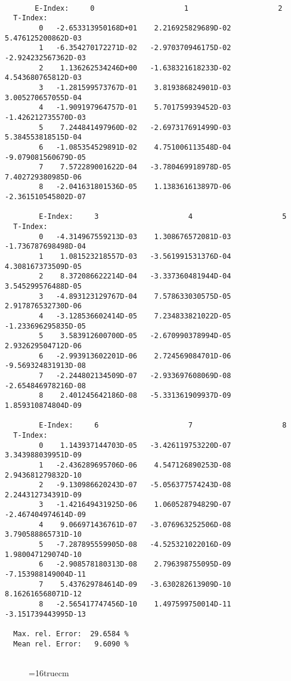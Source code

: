 \documentclass[12pt,dvipdfmx]{article}
\begin{document}
\begin{small}\begin{verbatim}

       E-Index:     0                     1                     2
  T-Index:
        0   -2.653313950168D+01    2.216925829689D-02    5.476125200862D-03
        1   -6.354270172271D-02   -2.970370946175D-02   -2.924232567362D-03
        2    1.136262534246D+00   -1.638321618233D-02    4.543680765812D-03
        3   -1.281599573767D-01    3.819386824901D-03    3.005270657055D-04
        4   -1.909197964757D-01    5.701759939452D-03   -1.426212735570D-03
        5    7.244841497960D-02   -2.697317691499D-03    5.384553818515D-04
        6   -1.085354529891D-02    4.751006113548D-04   -9.079081560679D-05
        7    7.572289001622D-04   -3.780469918978D-05    7.402729380985D-06
        8   -2.041631801536D-05    1.138361613897D-06   -2.361510545802D-07

        E-Index:     3                     4                     5
  T-Index:
        0   -4.314967559213D-03    1.308676572081D-03   -1.736787698498D-04
        1    1.081523218557D-03   -3.561991531376D-04    4.308167373509D-05
        2    8.372086622214D-04   -3.337360481944D-04    3.545299576488D-05
        3   -4.893123129767D-04    7.578633030575D-05    2.917876532730D-06
        4   -3.128536602414D-05    7.234833821022D-05   -1.233696295835D-05
        5    3.583912600700D-05   -2.670990378994D-05    2.932629504712D-06
        6   -2.993913602201D-06    2.724569084701D-06   -9.569324831913D-08
        7   -2.244802134509D-07   -2.933697608069D-08   -2.654846978216D-08
        8    2.401245642186D-08   -5.331361909937D-09    1.859310874804D-09

        E-Index:     6                     7                     8
  T-Index:
        0    1.143937144703D-05   -3.426119753220D-07    3.343988039951D-09
        1   -2.436289695706D-06    4.547126890253D-08    2.943681279832D-10
        2   -9.130986620243D-07   -5.056377574243D-08    2.244312734391D-09
        3   -1.421649431925D-06    1.060528794829D-07   -2.467404974614D-09
        4    9.066971436761D-07   -3.076963252506D-08    3.790588865731D-10
        5   -7.287895559905D-08   -4.525321022016D-09    1.980047129074D-10
        6   -2.908578180313D-08    2.796398755095D-09   -7.153988149004D-11
        7    5.437629784614D-09   -3.630282613909D-10    8.162616568071D-12
        8   -2.565417747456D-10    1.497599750014D-11   -3.151739443995D-13

  Max. rel. Error:  29.6584 %
  Mean rel. Error:   9.6090 %


\end{verbatim}\end{small}
\begin{figure} \label{2.3.8rl}
\epsfxsize=16truecm 
\end{figure}
\newpage
\end{document}
